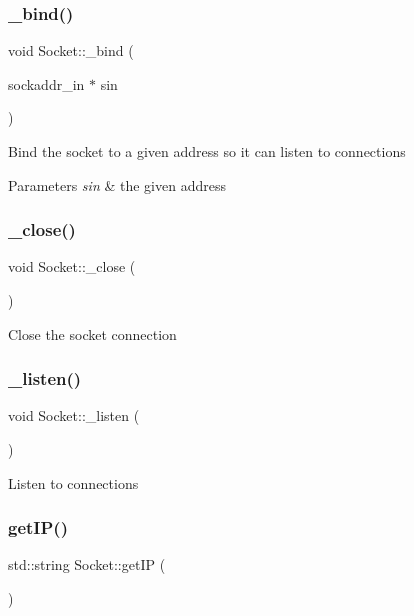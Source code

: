 \subsubsection{\texorpdfstring{\+\_\+bind()}{\_bind()}}
{\footnotesize\ttfamily void Socket\+::\+\_\+bind (\begin{DoxyParamCaption}\item[{sockaddr\+\_\+in $\ast$}]{sin }\end{DoxyParamCaption})}

Bind the socket to a given address so it can listen to connections


\begin{DoxyParams}{Parameters}
{\em sin} & the given address \\
\hline
\end{DoxyParams}
\mbox{\label{classSocket_a284f2130a4115a77ebce742427fd0bdb}} 
\subsubsection{\texorpdfstring{\+\_\+close()}{\_close()}}
{\footnotesize\ttfamily void Socket\+::\+\_\+close (\begin{DoxyParamCaption}{ }\end{DoxyParamCaption})}

Close the socket connection \mbox{\label{classSocket_ac54a69178584b414d8137170156ad742}} 
\subsubsection{\texorpdfstring{\+\_\+listen()}{\_listen()}}
{\footnotesize\ttfamily void Socket\+::\+\_\+listen (\begin{DoxyParamCaption}{ }\end{DoxyParamCaption})}

Listen to connections \mbox{\label{classSocket_a5f78c7dbb42b062df843a66431acd0de}} 
\subsubsection{\texorpdfstring{get\+I\+P()}{getIP()}}
{\footnotesize\ttfamily std\+::string Socket\+::get\+IP (\begin{DoxyParamCaption}{ }\end{DoxyParamCaption})\hspace{0.3cm}{\ttfamily [static]}}

